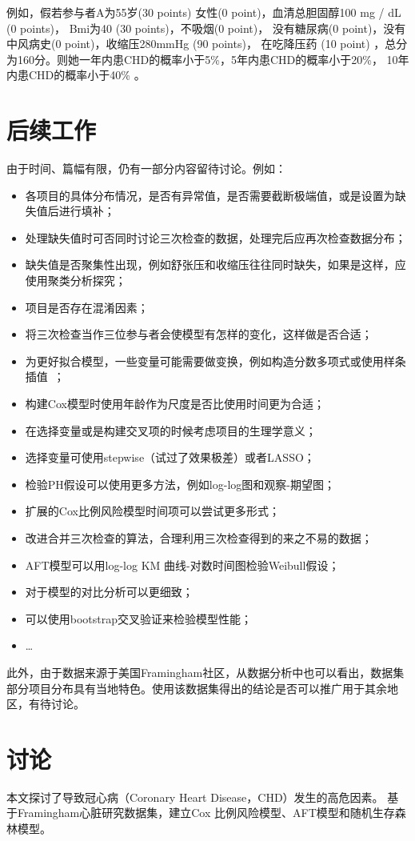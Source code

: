 \documentclass[lang=cn,11pt,a4paper,cite=super,AutoFakeBold]{elegantpaper}
\begin{document}
例如，假若参与者A为55岁(30 points) 女性(0 point)，血清总胆固醇100 mg / dL (0 points)，
Bmi为40 (30 points)，不吸烟(0 point)，
没有糖尿病(0 point)，没有中风病史(0 point)，收缩压280mmHg (90 points)，
在吃降压药 (10 point) ，总分为160分。则她一年内患CHD的概率小于5\%，5年内患CHD的概率小于20\%，
10年内患CHD的概率小于40\% 。


\section{后续工作}
由于时间、篇幅有限，仍有一部分内容留待讨论。例如：
\begin{itemize}
   \item 各项目的具体分布情况，是否有异常值，是否需要截断极端值，或是设置为缺失值后进行填补；
   \item 处理缺失值时可否同时讨论三次检查的数据，处理完后应再次检查数据分布；
   \item 缺失值是否聚集性出现，例如舒张压和收缩压往往同时缺失，如果是这样，应使用聚类分析探究；
   \item 项目是否存在混淆因素；
   \item 将三次检查当作三位参与者会使模型有怎样的变化，这样做是否合适；
   \item 为更好拟合模型，一些变量可能需要做变换，例如构造分数多项式或使用样条插值~\cite{roy}；
   \item 构建Cox模型时使用年龄作为尺度是否比使用时间更为合适；
   \item 在选择变量或是构建交叉项的时候考虑项目的生理学意义；
   \item 选择变量可使用stepwise（试过了效果极差）或者LASSO；
   \item 检验PH假设可以使用更多方法，例如log-log图和观察-期望图；
   \item 扩展的Cox比例风险模型时间项可以尝试更多形式；
   \item 改进合并三次检查的算法，合理利用三次检查得到的来之不易的数据；
   \item AFT模型可以用log-log KM 曲线-对数时间图检验Weibull假设；
   \item 对于模型的对比分析可以更细致；
   \item 可以使用bootstrap交叉验证来检验模型性能；
   \item \dots
\end{itemize}

此外，由于数据来源于美国Framingham社区，从数据分析中也可以看出，数据集
部分项目分布具有当地特色。使用该数据集得出的结论是否可以推广用于其余地区，有待讨论。

\section{讨论}
本文探讨了导致冠心病（Coronary Heart Disease，CHD）发生的高危因素。
基于Framingham心脏研究数据集，建立Cox 比例风险模型、AFT模型和随机生存森林模型。
\end{document}
